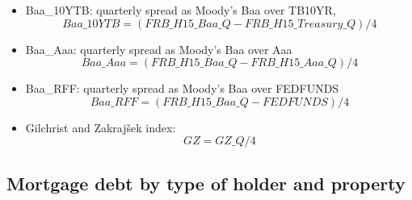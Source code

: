 \documentclass[3p,review,times]{elsarticle}		%
\begin{document}
\begin{description}
	\begin{itemize}
		\item Baa\_10YTB: quarterly spread as Moody's Baa over TB10YR, 
		$$Baa\_10YTB=(FRB\_H15\_Baa\_Q - FRB\_H15\_Treasury\_Q)/4 $$
		\item Baa\_Aaa: quarterly spread as Moody's Baa over Aaa
		$$Baa\_Aaa=(FRB\_H15\_Baa\_Q - FRB\_H15\_Aaa\_Q)/4 $$
		\item Baa\_RFF: quarterly spread as Moody's Baa over FEDFUNDS
		$$ Baa\_RFF=(FRB\_H15\_Baa\_Q - FEDFUNDS)/4 $$
		\item Gilchrist and Zakrajšek index:
		$$GZ=GZ\_Q/4$$
	\end{itemize}
\end{description}

\subsection{Mortgage debt by type of holder and property}
\end{document}
